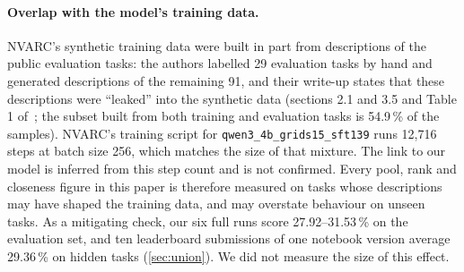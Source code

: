 \documentclass[11pt]{article}
\newcommand{\code}[1]{\texttt{#1}}
\begin{document}
\paragraph{Overlap with the model's training data.}
NVARC's synthetic training data were built in part from descriptions of the public evaluation tasks: the authors labelled 29 evaluation tasks by hand and generated descriptions of the remaining 91, and their write-up states that these descriptions were ``leaked'' into the synthetic data (sections 2.1 and 3.5 and Table 1 of~\citet{nvarc2025}; the subset built from both training and evaluation tasks is 54.9\,\% of the samples). NVARC's training script for \code{qwen3\_4b\_grids15\_sft139} runs 12,716 steps at batch size 256, which matches the size of that mixture. The link to our model is inferred from this step count and is not confirmed.
Every pool, rank and closeness figure in this paper is therefore measured on tasks whose descriptions may have shaped the training data, and may overstate behaviour on unseen tasks. As a mitigating check, our six full runs score 27.92--31.53\,\% on the evaluation set, and ten leaderboard submissions of one notebook version average 29.36\,\% on hidden tasks (\cref{sec:union}). We did not measure the size of this effect.
\end{document}
